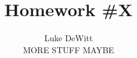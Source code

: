 \documentclass{amsart}
\begin{document}
  \title{\bf Homework \#X}
  \author{Luke DeWitt\\
  MORE STUFF MAYBE}
  \maketitle
\end{document}
